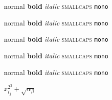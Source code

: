 \documentclass[conference]{IEEEtran}
\begin{document}
{\normalsize normal} {\normalsize \textbf{bold}} {\normalsize \textit{italic}} {\normalsize \textsc{smallcaps}} {\normalsize \texttt{mono}}

{\large normal} {\large \textbf{bold}} {\large \textit{italic}} {\large \textsc{smallcaps}} {\large \texttt{mono}}

{\Large normal} {\Large \textbf{bold}} {\Large \textit{italic}} {\Large \textsc{smallcaps}} {\Large \texttt{mono}}

{\LARGE normal} {\LARGE \textbf{bold}} {\LARGE \textit{italic}} {\LARGE \textsc{smallcaps}} {\LARGE \texttt{mono}}

{\huge normal} {\huge \textbf{bold}} {\huge \textit{italic}} {\huge \textsc{smallcaps}} {\huge \texttt{mono}}

$x_{i_{j}}^{2^{3}} + \sqrt{\alpha_\beta}$



\end{document}
